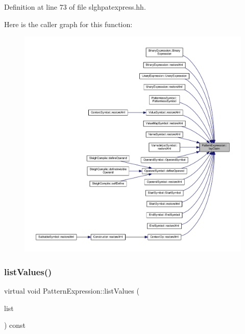 Definition at line 73 of file slghpatexpress.\+hh.

Here is the caller graph for this function\+:
\nopagebreak
\begin{figure}[H]
\begin{center}
\leavevmode
\includegraphics[width=350pt]{class_pattern_expression_a922b328bd6bea398bf294e505378cee0_icgraph}
\end{center}
\end{figure}
\mbox{\label{class_pattern_expression_a48d1a8fce687ba5c272b2e0d72760363}} 
\subsubsection{\texorpdfstring{listValues()}{listValues()}}
{\footnotesize\ttfamily virtual void Pattern\+Expression\+::list\+Values (\begin{DoxyParamCaption}\item[{vector$<$ const \mbox{\hyperlink{class_pattern_value}{Pattern\+Value}} $\ast$ $>$ \&}]{list }\end{DoxyParamCaption}) const\hspace{0.3cm}{\ttfamily [pure virtual]}}



